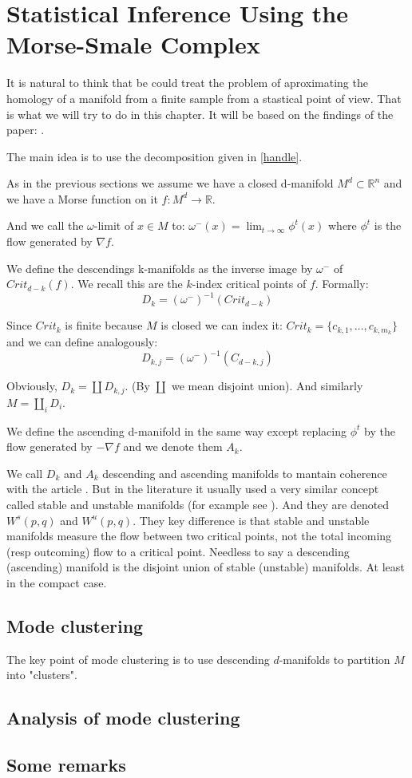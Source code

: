 \chapter{Statistical Inference Using the
Morse-Smale Complex}

It is natural to think that be could treat the problem
of aproximating the homology of a manifold from a finite 
sample from a stastical point of view. 
That is what we will try to do in this chapter. It will be based on the findings of the paper: \cite{che2017}.

The main idea is to use the decomposition given in \ref{handle}.

As in the previous sections we assume we have a closed d-manifold $M^d\subset \mathbb{R}^n$
and we have a Morse function on it $f:M^d\rightarrow \mathbb{R}$.

And we call the $\omega$-limit of $x\in M$ to:
$\omega^-(x)=\displaystyle\lim_{t\to \infty} \phi^t(x)$ where $\phi^t$ is 
the flow generated by $\nabla f$.

We define the descendings k-manifolds as the inverse image by $\omega^-$ of $Crit_{d-k}(f)$. 
We recall this are the $k$-index critical points of $f$.
Formally:
$$
D_k=
(\omega^-)^{-1}(Crit_{d-k})
$$

Since $Crit_k$ is finite because $M$ is closed we can index it:
$Crit_k=\{c_{k,1},\ldots,c_{k,m_k}\}$ and we can define analogously:
$$
D_{k,j}=
(\omega^-)^{-1}(C_{d-k,j})
$$

Obviously, $D_k=\coprod D_{k,j}$. (By $\coprod$ we mean disjoint union). And similarly
$M=\coprod_i D_i$.

We define the ascending d-manifold in the same way except replacing $\phi^t$ by the flow generated by $-\nabla f$
and we denote them $A_k$.

\begin{remark}
We call $D_k$ and $A_k$
descending and ascending manifolds to mantain coherence with the article \cite{che2017}.
But in the literature it usually used a very similar concept called stable and unstable manifolds (for example
see \cite{che2014}).
And they are denoted $W^s(p,q)$ and $W^u(p,q)$.
They key difference is that stable and unstable manifolds measure the flow between two critical points, not the total
incoming (resp outcoming) flow to a critical point. Needless to say a descending (ascending) manifold is the disjoint 
union of stable (unstable) manifolds.
At least in the compact case.
\end{remark}

\section{Mode clustering}
The key point of mode clustering is to use descending $d$-manifolds to partition $M$ into "clusters".


\section{Analysis of mode clustering}


\section{Some remarks}
